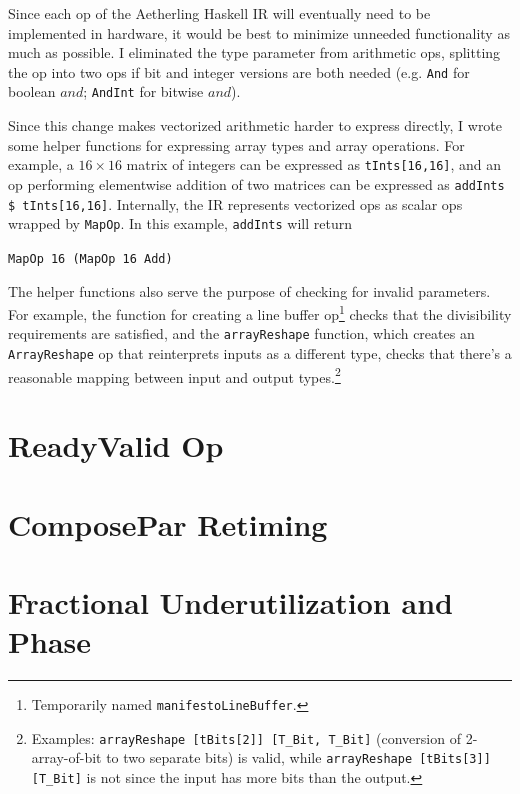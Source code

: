 \documentclass[12pt]{article}
\begin{document}
Since each op of the Aetherling Haskell IR will eventually need to be
implemented in hardware, it would be best to minimize unneeded
functionality as much as possible. I eliminated the type parameter
from arithmetic ops, splitting the op into two ops if bit and integer
versions are both needed (e.g. \texttt{And} for boolean $and$;
\texttt{AndInt} for bitwise $and$).

Since this change makes vectorized arithmetic harder to express
directly, I wrote some helper functions for expressing array types and
array operations. For example, a $16\times 16$ matrix of integers can
be expressed as \texttt{tInts[16,16]}, and an op performing
elementwise addition of two matrices can be expressed as
\texttt{addInts \$ tInts[16,16]}. Internally, the IR represents
vectorized ops as scalar ops wrapped by \texttt{MapOp}.
In this example, \texttt{addInts} will return

\texttt{MapOp 16 (MapOp 16 Add)}

The helper functions also serve the purpose of checking for invalid
parameters. For example, the function for creating a line buffer
op\footnote{Temporarily named \texttt{manifestoLineBuffer}.} checks that the
divisibility requirements are satisfied, and the \texttt{arrayReshape}
function, which creates an \texttt{ArrayReshape} op that reinterprets
inputs as a different type, checks that there's a reasonable mapping
between input and output types.\footnote{
Examples: \texttt{arrayReshape [tBits[2]] [T\_Bit, T\_Bit]} (conversion of
2-array-of-bit to two separate bits) is valid, while
\texttt{arrayReshape [tBits[3]] [T\_Bit]} is not since the input has
more bits than the output.}

\section{ReadyValid Op}

\section{ComposePar Retiming}

\section{Fractional Underutilization and Phase}

\end{document}
